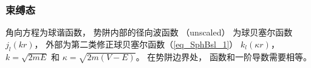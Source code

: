 
\begin{issues}
\issueDraft
\end{issues}


\subsubsection{束缚态}

角向方程为球谐函数， 势阱内部的径向波函数 （unscaled） 为球贝塞尔函数 $j_l(kr)$，  外部为第二类修正球贝塞尔函数（\autoref{eq_SphBsl_1}） $k_l(\kappa r)$，   $k = \sqrt{2mE}$ 和 $\kappa = \sqrt{2m(V - E)}$。 在势阱边界处， 函数和一阶导数需要相等。 
